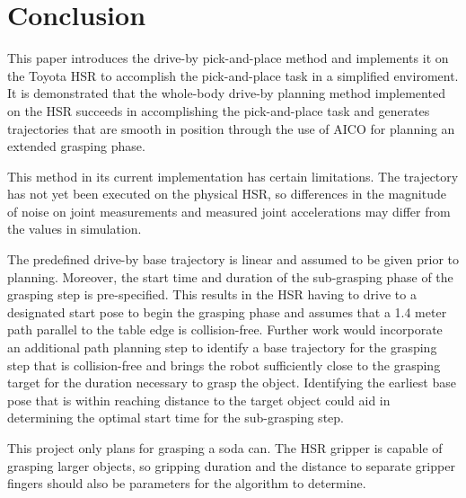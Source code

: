 \documentclass[12pt]{article}
\begin{document}

    \newpage     
    \section{Conclusion}
        This paper introduces the drive-by pick-and-place method and implements it on the Toyota HSR to accomplish the pick-and-place task in a simplified enviroment. It is demonstrated that the whole-body drive-by planning method implemented on the HSR succeeds in accomplishing the pick-and-place task and generates trajectories that are smooth in position through the use of AICO for planning an extended grasping phase.
        \par This method in its current implementation has certain limitations. The trajectory has not yet been executed on the physical HSR, so differences in the magnitude of noise on joint measurements and measured joint accelerations may differ from the values in simulation.

        \par The predefined drive-by base trajectory is linear and assumed to be given prior to planning. Moreover, the start time and duration of the sub-grasping phase of the grasping step is pre-specified. This results in the HSR having to drive to a designated start pose to begin the grasping phase and assumes that a 1.4 meter path parallel to the table edge is collision-free. Further work would incorporate an additional path planning step to identify a base trajectory for the grasping step that is collision-free and brings the robot sufficiently close to the grasping target for the duration necessary to grasp the object. Identifying the earliest base pose that is within reaching distance to the target object could aid in determining the optimal start time for the sub-grasping step.

        \par This project only plans for grasping a soda can. The HSR gripper is capable of grasping larger objects, so gripping duration and the distance to separate gripper fingers should also be parameters for the algorithm to determine.
\end{document}
